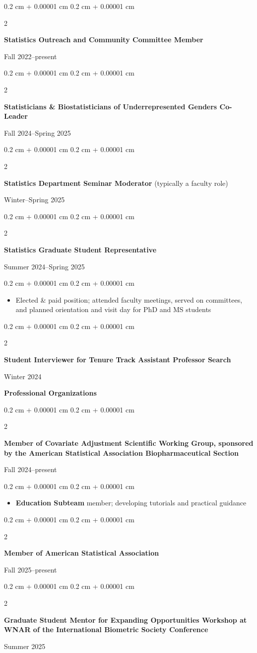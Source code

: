 \documentclass[10pt, letterpaper]{article}
\newenvironment{highlights}{
    \begin{itemize}[
        topsep=0.10 cm,
        parsep=0.10 cm,
        partopsep=0pt,
        itemsep=0pt,
        leftmargin=0.4 cm + 10pt
    ]
}{
    \end{itemize}
} %
\newenvironment{onecolentry}{
    \begin{adjustwidth}{
        0.2 cm + 0.00001 cm
    }{
        0.2 cm + 0.00001 cm
    }
}{
    \end{adjustwidth}
    \vspace{0.2cm} %
}
\newenvironment{twocolentry}[2][]{
    \onecolentry
    \def\secondColumn{#2}
    \setcolumnwidth{\fill, 4.5 cm}
    \begin{paracol}{2}
}{
    \switchcolumn \raggedleft \secondColumn
    \end{paracol}
    \endonecolentry
}
\begin{document}
\begin{twocolentry}{Fall 2022--present}
    \textbf{Statistics Outreach and Community Committee Member}   
\end{twocolentry}

\begin{twocolentry}{Fall 2024--Spring 2025}
    \textbf{Statisticians \& Biostatisticians of Underrepresented Genders Co-Leader}
\end{twocolentry}



\begin{twocolentry}{Winter--Spring 2025}
    \textbf{Statistics Department Seminar Moderator}  (typically a faculty role)
\end{twocolentry}

\begin{twocolentry}{Summer 2024--Spring 2025}
    \textbf{Statistics Graduate Student Representative} 
\end{twocolentry}
\begin{onecolentry}
    \begin{highlights}
        \item[] Elected \& paid position; attended faculty meetings, served on committees, and planned orientation and visit day for PhD and MS students
    \end{highlights}
\end{onecolentry}


\begin{twocolentry}{Winter 2024}
    \textbf{Student Interviewer for Tenure Track Assistant Professor Search} 
\end{twocolentry}

\bigskip

\textbf{Professional Organizations}

\vspace{3 mm}

\begin{twocolentry}{Fall 2024--present}
    \textbf{Member of Covariate Adjustment Scientific Working Group, sponsored by the American Statistical Association Biopharmaceutical Section}
\end{twocolentry}
\begin{onecolentry}
    \begin{highlights}
        \item[] \textbf{Education Subteam} member; developing tutorials and practical guidance
    \end{highlights}
\end{onecolentry}

\begin{twocolentry}{Fall 2025--present}
    \textbf{Member of American Statistical Association}
\end{twocolentry}

\begin{twocolentry}{Summer 2025}
    \textbf{Graduate Student Mentor for Expanding Opportunities Workshop at WNAR of the International Biometric Society Conference} 
\end{twocolentry}
\end{document}
